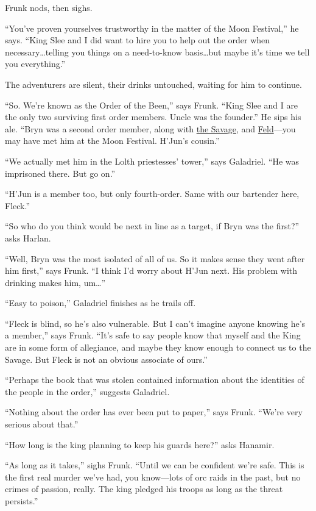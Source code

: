 \documentclass[smalldemyvopaper,11pt,twoside,onecolumn,openright,extrafontsizes]{memoir}
\begin{document}
Frunk nods, then sighs.

``You've proven yourselves trustworthy in the matter of the Moon
Festival,'' he says. ``King Slee and I did want to hire you to help out
the order when necessary\ldots telling you things on a need-to-know
basis\ldots but maybe it's time we tell you everything.''

The adventurers are silent, their drinks untouched, waiting for him to
continue.

``So. We're known as the Order of the Been,'' says Frunk. ``King Slee
and I are the only two surviving first order members. Uncle was the
founder.'' He sips his ale. ``Bryn was a second order member, along with
\href{/characters/the-savage/}{the Savage}, and
\href{/characters/feld/}{Feld}---you may have met him at the Moon
Festival. H'Jun's cousin.''

``We actually met him in the Lolth priestesses' tower,'' says Galadriel.
``He was imprisoned there. But go on.''

``H'Jun is a member too, but only fourth-order. Same with our bartender
here, Fleck.''

``So who do you think would be next in line as a target, if Bryn was the
first?'' asks Harlan.

``Well, Bryn was the most isolated of all of us. So it makes sense they
went after him first,'' says Frunk. ``I think I'd worry about H'Jun
next. His problem with drinking makes him, um\ldots{}''

``Easy to poison,'' Galadriel finishes as he trails off.

``Fleck is blind, so he's also vulnerable. But I can't imagine anyone
knowing he's a member,'' says Frunk. ``It's safe to say people know that
myself and the King are in some form of allegiance, and maybe they know
enough to connect us to the Savage. But Fleck is not an obvious
associate of ours.''

``Perhaps the book that was stolen contained information about the
identities of the people in the order,'' suggests Galadriel.

``Nothing about the order has ever been put to paper,'' says Frunk.
``We're very serious about that.''

``How long is the king planning to keep his guards here?'' asks Hanamir.

``As long as it takes,'' sighs Frunk. ``Until we can be confident we're
safe. This is the first real murder we've had, you know---lots of orc
raids in the past, but no crimes of passion, really. The king pledged
his troops as long as the threat persists.''
\end{document}

